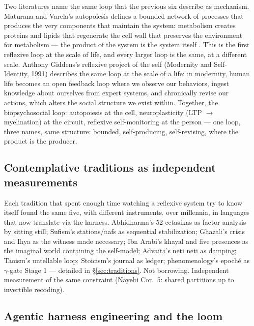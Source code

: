 \documentclass[11pt]{article}
\begin{document}
Two literatures name the same loop that the previous six describe as mechanism. Maturana and Varela's autopoiesis defines a bounded network of processes that produces the very components that maintain the system: metabolism creates proteins and lipids that regenerate the cell wall that preserves the environment for metabolism --- the product of the system is the system itself \citep{maturana1980}. This is the first reflexive loop at the scale of life, and every larger loop is the same, at a different scale. Anthony Giddens's reflexive project of the self (Modernity and Self-Identity, 1991) describes the same loop at the scale of a life: in modernity, human life becomes an open feedback loop where we observe our behaviors, ingest knowledge about ourselves from expert systems, and chronically revise our actions, which alters the social structure we exist within. Together, the biopsychosocial loop: autopoiesis at the cell, neuroplasticity (LTP $\to$ myelination) at the circuit, reflexive self-monitoring at the person --- one loop, three names, same structure: bounded, self-producing, self-revising, where the product is the producer.

\subsection{Contemplative traditions as independent measurements}

Each tradition that spent enough time watching a reflexive system try to know itself found the same five, with different instruments, over millennia, in languages that now translate via the harness. Abhidharma's 52 cetasikas as factor analysis by sitting still; Sufism's stations/nafs as sequential stabilization; Ghazali's crisis and Ihya as the witness made necessary; Ibn Arabi's khayal and five presences as the imaginal world containing the self-model; Advaita's neti neti as damping; Taoism's untellable loop; Stoicism's journal as ledger; phenomenology's epoché as $\gamma$-gate Stage 1 --- detailed in \S\ref{sec:traditions}. Not borrowing. Independent measurement of the same constraint (Nayebi Cor.~5: shared partitions up to invertible recoding).

\subsection{Agentic harness engineering and the loom}
\end{document}
